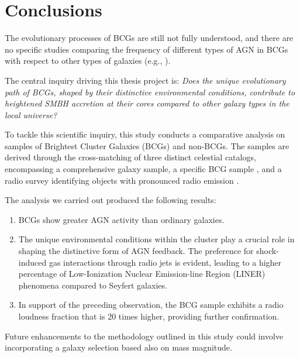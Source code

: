 \chapter*{Conclusions}

The evolutionary processes of BCGs are still not fully understood, and there are no specific
studies comparing the frequency of different types of AGN in BCGs with respect to other types of
galaxies (e.g., \cite{2019CoBAO..66..153F}).

The central inquiry driving this thesis project is: \textit{Does the unique evolutionary path of BCGs, shaped by their distinctive environmental conditions, contribute to heightened SMBH accretion at their cores compared to other galaxy types in the local universe?}

To tackle this scientific inquiry, this study conducts a comparative analysis on samples of Brightest Cluster Galaxies (BCGs) and non-BCGs. The samples are derived through the cross-matching of three distinct celestial catalogs, encompassing a comprehensive galaxy sample\cite{2009ApJS..182..543A}, a specific BCG sample \cite{2009yCat..73790867V}, and a radio survey identifying objects with pronounced radio emission \cite{2005MNRAS.362....9B}.

The analysis we carried out produced the following results:

\begin{enumerate}
\item BCGs show greater AGN activity than ordinary galaxies.
\item The unique environmental conditions within the cluster play a crucial role in shaping the distinctive form of AGN feedback. The preference for shock-induced gas interactions through radio jets is evident, leading to a higher percentage of Low-Ionization Nuclear Emission-line Region (LINER) phenomena compared to Seyfert galaxies.
\item In support of the preceding observation, the BCG sample exhibits a radio loudness fraction that is 20 times higher, providing further confirmation.
\end{enumerate}

Future enhancements to the methodology outlined in this study could involve incorporating a galaxy selection based also on mass magnitude.
